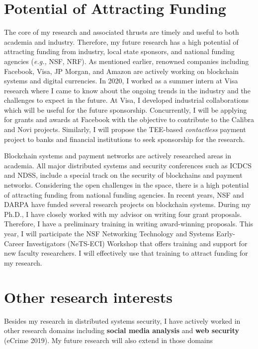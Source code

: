 \documentclass{NSF}
\newcommand{\eg}{{\em e.g.,}\xspace}
\begin{document}
\section{Potential of Attracting Funding}\vspace{-1mm}
The core of my research and associated thrusts are timely and useful to both academia and industry. Therefore, my future research has a high potential of attracting funding from industry, local state sponsors, and national funding agencies (\eg NSF, NRF). As mentioned earlier, renowned companies including Facebook, Visa, JP Morgan, and Amazon are actively working on blockchain systems and digital currencies. In 2020, I worked as a summer intern at Visa research where I came to know about the ongoing trends in the industry and the challenges to expect in the future. At Visa, I developed industrial collaborations which will be useful for the future sponsorship. Concurrently, I will be applying for grants and awards at Facebook with the objective to contribute to the Calibra and Novi projects. Similarly, I will propose the TEE-based {\em contactless} payment project to banks and financial institutions to seek sponsorship for the research. 

Blockchain systems and payment networks are actively researched areas in academia. All major distributed systems and security conferences such as ICDCS and NDSS, include a special track on the security of blockchains and payment networks. Considering the open challenges in the space, there is a high potential of attracting funding from national funding agencies. In recent years, NSF and DARPA have funded several research projects on blockchain systems. During my Ph.D., I have closely worked with my advisor on writing four grant proposals. Therefore, I have a preliminary training in writing award-winning proposals. This year, I will participate the NSF Networking Technology and Systems Early-Career Investigators (NeTS-ECI) Workshop that offers training and support for new faculty researchers. I will effectively use that training to attract funding for my research. 



\section{Other research interests} \vspace{-1mm}
Besides my research in distributed systems security, I have actively worked in other research domains including \textbf{social media analysis} and \textbf{web security} (eCrime 2019). My future research will also extend in those domains 
\end{document}
